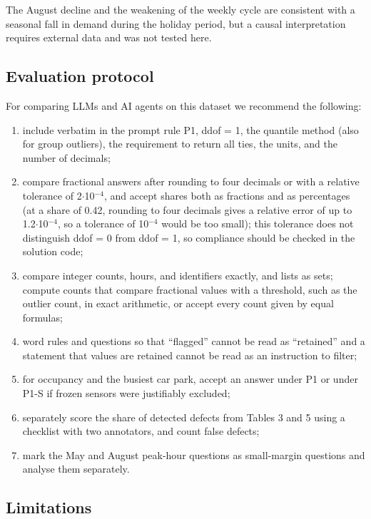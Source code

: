 \documentclass[default]{subfiles}
\begin{document}
{The August decline and the weakening of the weekly cycle are consistent with a seasonal fall in demand during the holiday period, but a causal interpretation requires external data and was not tested here.

\subsection{Evaluation protocol}

For comparing LLMs and AI agents on this dataset we recommend the following:

\begin{enumerate}
  \item include verbatim in the prompt rule P1, ddof = 1, the quantile method (also for group outliers), the requirement to return all ties, the units, and the number of decimals;
  \item compare fractional answers after rounding to four decimals or with a relative tolerance of 2$\cdot$10$^{-4}$, and accept shares both as fractions and as percentages (at a share of 0.42, rounding to four decimals gives a relative error of up to 1.2$\cdot$10$^{-4}$, so a tolerance of 10$^{-4}$ would be too small); this tolerance does not distinguish ddof = 0 from ddof = 1, so compliance should be checked in the solution code;
  \item compare integer counts, hours, and identifiers exactly, and lists as sets; compute counts that compare fractional values with a threshold, such as the outlier count, in exact arithmetic, or accept every count given by equal formulas;
  \item word rules and questions so that ``flagged'' cannot be read as ``retained'' and a statement that values are retained cannot be read as an instruction to filter;
  \item for occupancy and the busiest car park, accept an answer under P1 or under P1-S if frozen sensors were justifiably excluded;
  \item separately score the share of detected defects from Tables 3 and 5 using a checklist with two annotators, and count false defects;
  \item mark the May and August peak-hour questions as small-margin questions and analyse them separately.
\end{enumerate}

\subsection{Limitations}

}
\end{document}
